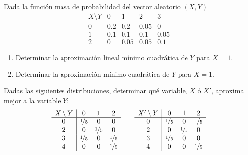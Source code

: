 \begin{ejercicio}
    Dada la función masa de probabilidad del vector aleatorio $(X,Y)$
    \begin{equation*}
        \begin{array}{c|cccc}
            X\setminus Y & 0 & 1 & 2 & 3\\
            \hline
            0 & 0.2 & 0.2 & 0.05 & 0\\
            1 & 0.1 & 0.1 & 0.1 & 0.05\\
            2 & 0 & 0.05 & 0.05 & 0.1
        \end{array}
    \end{equation*}
    \begin{enumerate}
        \item Determinar la aproximación lineal mínimo cuadrática de $Y$ para $X = 1$.
        \item Determinar la aproximación mínimo cuadrática de $Y$ para $X = 1$.
    \end{enumerate}
\end{ejercicio}

\begin{ejercicio}
    Dadas las siguientes distribuciones, determinar qué variable, $X$ ó $X'$, aproxima mejor a la variable $Y$:
    \begin{equation*}
        \begin{array}{c|ccc}
            X\setminus Y & 0 & 1 & 2\\
            \hline
            0 & \nicefrac{1}{5} & 0 & 0\\
            2 & 0 & \nicefrac{1}{5} & 0\\
            3 & \nicefrac{1}{5} & 0 & \nicefrac{1}{5}\\
            4 & 0 & 0 & \nicefrac{1}{5}
        \end{array}
        \qquad
        \begin{array}{c|ccc}
            X'\setminus Y & 0 & 1 & 2\\
            \hline
            0 & \nicefrac{1}{5} & 0 & \nicefrac{1}{5}\\
            2 & 0 & \nicefrac{1}{5} & 0\\
            3 & \nicefrac{1}{5} & 0 & 0\\
            4 & 0 & 0 & \nicefrac{1}{5}
        \end{array}
    \end{equation*}
\end{ejercicio}

